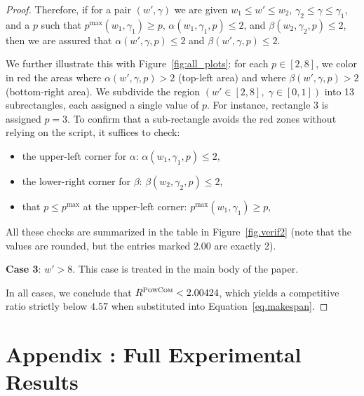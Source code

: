 \documentclass{article}
\newcommand\PCOM{\textsc{PowCom}\xspace}
\begin{document}
\begin{proof}
Therefore, if for a pair $(w',\gamma)$ we are given $w_1 \leq w' \leq w_2$, $\gamma_2 \leq \gamma \leq \gamma_1$, and a $p$ such that $p^{\max}(w_1,\gamma_1) \geq p$, $\alpha(w_1,\gamma_1,p) \leq 2$, and $\beta(w_2,\gamma_2,p) \leq 2$, then we are assured that $\alpha(w',\gamma,p) \leq 2$ and $\beta(w',\gamma,p) \leq 2$.

We further illustrate this with Figure~\ref{fig:all_plots}: for each $p \in [2,8]$, we color in red the areas where $\alpha(w',\gamma,p) > 2$ (top-left area) and where $\beta(w',\gamma,p) > 2$ (bottom-right area). We subdivide the region $(w' \in [2,8],\; \gamma \in [0,1])$ into 13 subrectangles, each assigned a single value of $p$. For instance, rectangle 3 is assigned $p = 3$. To confirm that a sub-rectangle avoids the red zones without relying on the
script, it suffices to check:
\begin{itemize}
    \item the upper-left corner for $\alpha$: $\alpha(w_1, \gamma_1, p) \leq 2$,
    \item the lower-right corner for $\beta$: $\beta(w_2, \gamma_2, p) \leq 2$,
    \item that $p \leq p^{\max}$ at the upper-left corner: $p^{\max}(w_1, \gamma_1) \geq p$,
\end{itemize}

All these checks are summarized in the table in Figure~\ref{fig.verif2} (note that the values are rounded, but the entries marked $2.00$ are exactly 2).

\textbf{Case 3}: $w' > 8$.  
This case is treated in the main body of the paper.

\smallskip
\noindent
In all cases, we conclude that \(R^{\PCOM}<2.00424\), which yields a competitive ratio strictly below \(4.57\) when substituted into Equation~\ref{eq.makespan}.
\end{proof}


\FloatBarrier 
\newpage
\section{Appendix : Full Experimental Results}
\label{ap.experiments}
\end{document}
